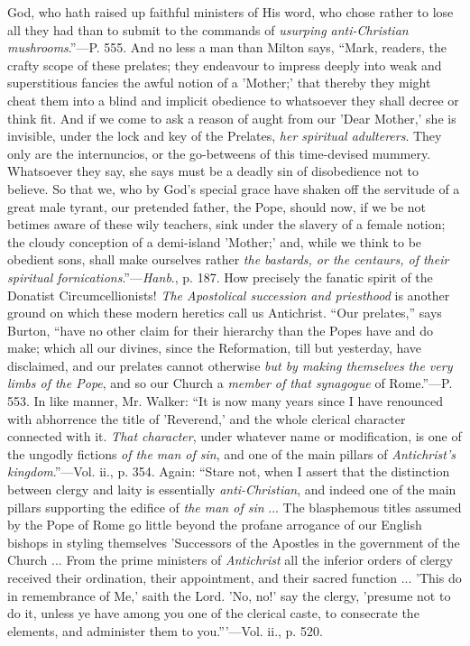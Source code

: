 God, who hath raised up faithful ministers of His word, who chose
rather to lose all they had than to submit to the commands of \emph{usurping
anti-Christian mushrooms}.''—P. 555. And no less a man than
Milton says, ``Mark, readers, the crafty scope of these prelates;
they endeavour to impress deeply into weak and superstitious fancies
the awful notion of a 'Mother;' that thereby they might cheat them
into a blind and implicit obedience to whatsoever they shall decree or
think fit. And if we come to ask a reason of aught from our 'Dear
Mother,' she is invisible, under the lock and key of the Prelates, \emph{her
spiritual adulterers}. They only are the internuncios, or the
go-betweens of this time-devised mummery. Whatsoever they say, she
says must be a deadly sin of disobedience not to believe. So that we,
who by God's special grace have shaken off the servitude of a great
male tyrant, our pretended father, the Pope, should now, if we be not
betimes aware of these wily teachers, sink under the slavery of a
female notion; the cloudy conception of a demi-island 'Mother;' and,
while we think to be obedient sons, shall make ourselves rather \emph{the
bastards, or the centaurs, of their spiritual fornications}.''—\emph{Hanb}.,
p. 187. How precisely the fanatic spirit of the Donatist
Circumcellionists!
\emph{The Apostolical succession and priesthood} is another ground on
which these modern heretics call us Antichrist. ``Our
prelates,'' says Burton, ``have no other claim for their
hierarchy than the Popes have and do make; which all our divines,
since the Reformation, till but yesterday, have disclaimed, and our
prelates cannot otherwise \emph{but by making themselves the very limbs
of the Pope}, and so our Church a \emph{member of that synagogue}
of Rome.''—P. 553. In like manner, Mr. Walker: ``It is now
many years since I have renounced with abhorrence the title of
'Reverend,' and the whole clerical character connected with it. \emph{That
character}, under whatever name or modification, is one of the
ungodly fictions \emph{of the man of sin}, and one of the main pillars
of \emph{Antichrist's kingdom}.''—Vol. ii., p. 354. Again:
``Stare not, when I assert that the distinction between clergy and
laity is essentially \emph{anti-Christian}, and indeed one of the main
pillars supporting the edifice of \emph{the man of sin} ... The
blasphemous titles assumed by the Pope of Rome go little beyond the
profane arrogance of our English bishops in styling themselves
'Successors of the Apostles in the government of the Church ... From
the prime ministers of \emph{Antichrist} all the inferior orders of
clergy received their ordination, their appointment, and their sacred
function ... 'This do in remembrance of Me,' saith the Lord. 'No, no!'
say the clergy, 'presume not to do it, unless ye have among you one of
the clerical caste, to consecrate the elements, and administer them to
you.'''—Vol. ii., p. 520.

